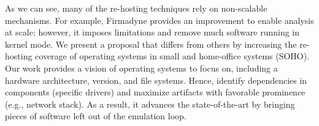 As we can see, many of the re-hosting techniques rely on non-scalable mechanisms. For example, Firmadyne provides an improvement to enable analysis at scale; however, it imposes limitations and remove much software running in kernel mode.  We present a proposal that differs from others by increasing the re-hosting coverage of operating systems in small and home-office systems (SOHO).  Our work provides a vision of operating systems to focus on, including a hardware architecture, version, and file systems.  Hence, identify dependencies in components (specific drivers) and maximize artifacts with favorable prominence (e.g., network stack).  As a result, it advances the state-of-the-art by bringing pieces of software left out of the emulation loop.